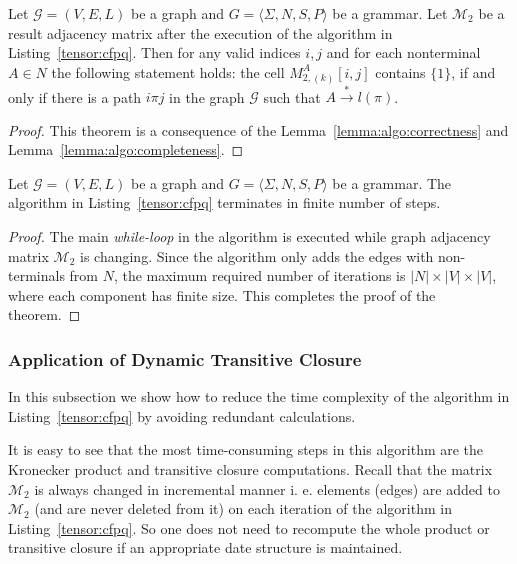 \begin{theorem}
    Let $\mathcal{G} = (V,E,L)$ be a graph and $G = \langle\Sigma, N, S, P\rangle$ be a grammar.
    Let $\mathcal{M}_{2}$ be a result adjacency matrix after the execution of the algorithm in Listing~\ref{tensor:cfpq}. Then for any valid indices $i, j$ and for each nonterminal $A \in N$ the following statement holds: the cell $M_{2,(k)}^A[i,j]$ contains $\{1\}$, if and only if there is a path $i\pi j$ in the graph $\mathcal{G}$ such that $ A \xrightarrow{*} l(\pi)$.
\end{theorem}{}
    
\begin{proof}
    
    This theorem is a consequence of the  
    Lemma~\ref{lemma:algo:correctness} and 
    Lemma~\ref{lemma:algo:completeness}.
    
\end{proof}{}

\begin{theorem}{}
    Let $\mathcal{G} = (V,E,L)$ be a graph and $G = \langle\Sigma, N, S, P\rangle$ be a grammar.
    The algorithm in Listing~\ref{tensor:cfpq} terminates in finite number of steps.
\end{theorem}

\begin{proof}
    
    The main \textit{while-loop} in the algorithm is executed while graph adjacency 
    matrix $\mathcal{M}_2$ is changing. Since the algorithm only adds the edges with 
    non-terminals from $N$, the maximum required number of iterations 
    is $|N| \times |V| \times |V|$, where each component has finite size. 
    This completes the proof of the theorem.
    
\end{proof}{}


\subsubsection{Application of Dynamic Transitive Closure}

In this subsection we show how to reduce the time complexity of the algorithm in Listing~\ref{tensor:cfpq} by avoiding redundant calculations. 


It is easy to see that the most time-consuming steps in this algorithm are the Kronecker product and transitive closure computations. Recall that the matrix $\mathcal{M}_2$ is always changed in incremental manner i. e. elements (edges) are added to $\mathcal{M}_2$ (and are never deleted from it) on each iteration of the algorithm in Listing~\ref{tensor:cfpq}. So one does not need to recompute the whole product or transitive closure if an appropriate date structure is maintained.


